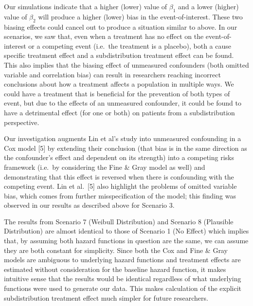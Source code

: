 \documentclass[12pt,PhD,twoside,openright]{muthesis}
\begin{document}
Our simulations indicate that a higher (lower) value of \(\beta_1\) and a lower (higher) value of \(\beta_2\) will produce a higher (lower) bias in the event-of-interest. These two biasing effects could cancel out to produce a situation similar to above. In our scenarios, we saw that, even when a treatment has no effect on the event-of-interest or a competing event (i.e.~the treatment is a placebo), both a cause specific treatment effect and a subdistribution treatment effect can be found. This also implies that the biasing effect of unmeasured confounders (both omitted variable and correlation bias) can result in researchers reaching incorrect conclusions about how a treatment affects a population in multiple ways. We could have a treatment that is beneficial for the prevention of both types of event, but due to the effects of an unmeasured confounder, it could be found to have a detrimental effect (for one or both) on patients from a subdistribution perspective.

Our investigation augments Lin et al's study into unmeasured confounding in a Cox model {[}5{]} by extending their conclusion (that bias is in the same direction as the confounder's effect and dependent on its strength) into a competing risks framework (i.e.~by considering the Fine \& Gray model as well) and demonstrating that this effect is reversed when there is confounding with the competing event. Lin et al.~{[}5{]} also highlight the problems of omitted variable bias, which comes from further misspecification of the model; this finding was observed in our results as described above for Scenario 3.

The results from Scenario 7 (Weibull Distribution) and Scenario 8 (Plausible Distribution) are almost identical to those of Scenario 1 (No Effect) which implies that, by assuming both hazard functions in question are the same, we can assume they are both constant for simplicity. Since both the Cox and Fine \& Gray models are ambiguous to underlying hazard functions and treatment effects are estimated without consideration for the baseline hazard function, it makes intuitive sense that the results would be identical regardless of what underlying functions were used to generate our data. This makes calculation of the explicit subdistribution treatment effect much simpler for future researchers.
\end{document}
